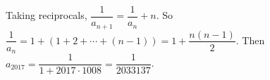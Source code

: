 Taking reciprocals, $\dfrac1{a_{n+1}}=\dfrac1{a_n}+n$. So $\dfrac1{a_n}=1+(1+2+\cdots+(n-1))=1+\dfrac{n(n-1)}2$. Then $a_{2017}=\dfrac1{1+2017\cdot1008}=\boxed{\dfrac1{2033137}}$.
